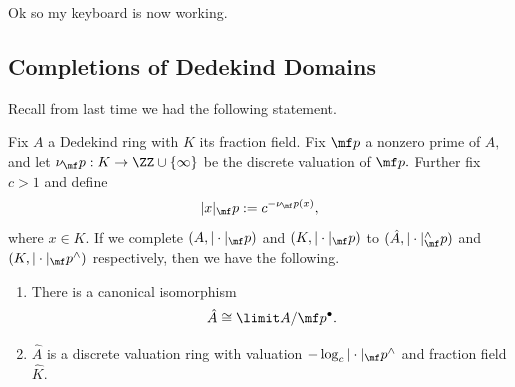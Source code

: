 













Ok so my keyboard is now working.

\subsection{Completions of Dedekind Domains}
Recall from last time we had the following statement.
\begin{proposition}
	Fix $A$ a Dedekind ring with $K$ its fraction field. Fix $\mf p$ a nonzero prime of $A,$ and let $\nu_\mf p:K\to\ZZ\cup\{\infty\}$ be the discrete valuation of $\mf p.$ Further fix $c>1$ and define
	\[|x|_\mf p:=c^{-\nu_\mf p(x)},\]
	where $x\in K.$ If we complete $(A,|\cdot|_\mf p)$ and $(K,|\cdot|_\mf p)$ to $(\hat A,|\cdot|^\wedge_\mf p)$ and $(K,|\cdot|_\mf p^\wedge)$ respectively, then we have the following.
	\begin{enumerate}[label=(\alph*)]
		\item There is a canonical isomorphism
		\[\hat A\cong\limit A/\mf p^\bullet.\]
		\item $\hat A$ is a discrete valuation ring with valuation $-\log_c|\cdot|_\mf p^\wedge$ and fraction field $\hat K.$
	\end{enumerate}
\end{proposition}
